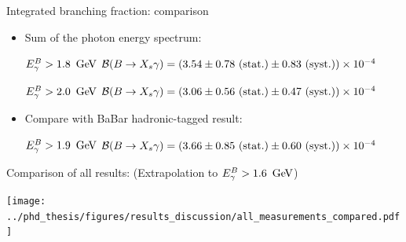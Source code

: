 \documentclass[xcolor=dvipsnames]{beamer}
\begin{document}
\begin{frame}{Integrated branching fraction: comparison}
\centering\scriptsize

\begin{itemize}
   \item Sum of the photon energy spectrum:
\end{itemize}
\begin{itemize}
   \centering
   \item[${E^B_{\gamma}}>1.8~\mathrm{\,Ge\kern -0.1em V}$] $\mathcal{B}(\BtoXsgamma) = (3.54 \pm 0.78~(\text{stat.}) \pm 0.83~(\text{syst.}))\times 10^{-4}$ \\
   \item[${E^B_{\gamma}}>2.0~\mathrm{\,Ge\kern -0.1em V}$] $\mathcal{B}(\BtoXsgamma) = (3.06 \pm 0.56~(\text{stat.}) \pm 0.47~(\text{syst.}))\times 10^{-4} $ \\
\end{itemize}

\begin{itemize}
   \item Compare with BaBar hadronic-tagged result:
\end{itemize}
\begin{itemize}
   \centering
   \item[${E^B_{\gamma}}>1.9~\mathrm{\,Ge\kern -0.1em V}$]  $\mathcal{B}(\BtoXsgamma) = (3.66 \pm 0.85~(\text{stat.}) \pm 0.60~(\text{syst.}))\times 10^{-4}$ \\
\end{itemize}

\vspace{10pt}

Comparison of all results: (Extrapolation to ${E^B_{\gamma}}>1.6~\mathrm{\,Ge\kern -0.1em V}$)

      \texttt{[image: ../phd\_thesis/figures/results\_discussion/all\_measurements\_compared.pdf]}


      
\end{frame}
\end{document}
